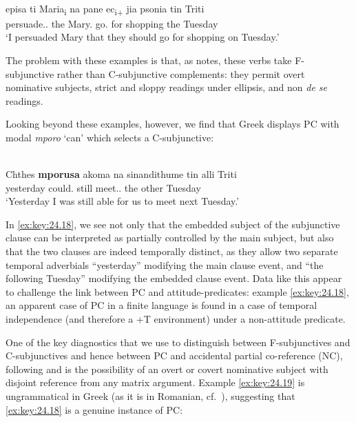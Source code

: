 \documentclass[output=paper]{langsci/langscibook}
\begin{document}
\ea%
    \label{ex:key:24.17}  \parencite[(34a), ((35a)]{Spyropoulos2007b}\\
	\gll episa       ti Maria\textsubscript{i}   na   pane ec\textsubscript{i+}   jia psonia tin Triti\\
        persuade.\Fsg{}.\Pst{}   the Mary.\Acc{} \Sbjv{} go.\Tpl{} {}  for shopping the Tuesday\\
	\glt ‘I persuaded Mary that they should go for shopping on Tuesday.’\\
\z

The problem with these examples is that, as \citet{Varlokosta1994} notes, these
verbs take F-subjunctive rather than C-subjunctive complements: they permit
overt nominative subjects, strict and sloppy readings under
ellipsis, and non \emph{de se} readings.

Looking beyond these examples, however, we find that Greek displays
\gls{PC} with modal \emph{mporo} ‘can’ which
selects a C-subjunctive:

\ea%
    \label{ex:key:24.18} \\
	\gll Chthes   \textbf{mporusa}  akoma na     sinandithume tin alli Triti\\
        yesterday  could.\Fsg{}  still     \Sbjv{} meet.\Sbjv{}.\Fpl{}  the other Tuesday\\
	\glt ‘Yesterday I was still able for us to meet next Tuesday.’
\z

In \eqref{ex:key:24.18}, we see not only that the embedded subject of the subjunctive clause
can be interpreted as partially controlled by the main subject, but also that
the two clauses are indeed temporally distinct, as they allow two separate
temporal adverbials “yesterday” modifying the main clause event, and “the
following Tuesday” modifying the embedded clause event. Data like this appear
to challenge the link between \gls{PC} and
attitude-predicates: example \eqref{ex:key:24.18}, an apparent case of
\gls{PC} in a finite  language is found in a
case of temporal independence (and therefore a +T environment) under a
non-attitude predicate.

One of the key diagnostics that we use to distinguish between F-subjunctives
and C-subjunctives and hence between \gls{PC} and
accidental partial co-reference (NC), following \citet{Varlokosta1994} and
\citet{Landau2004} is the possibility of an overt or covert
nominative subject with disjoint reference from any matrix
argument. Example \eqref{ex:key:24.19} is ungrammatical in Greek (as it is in
Romanian, cf.\ ), suggesting that \eqref{ex:key:24.18} is a
genuine instance of PC:
\end{document}
